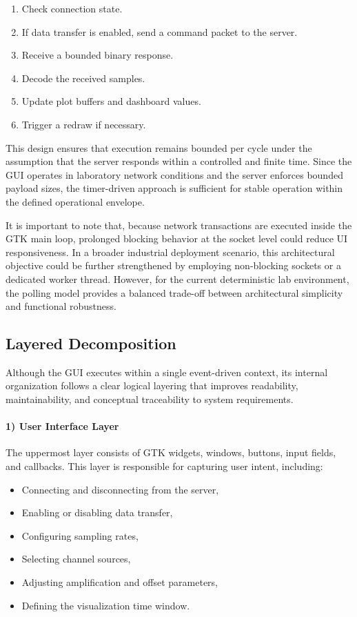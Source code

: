 \begin{enumerate}
	\item Check connection state.
	\item If data transfer is enabled, send a command packet to the server.
	\item Receive a bounded binary response.
	\item Decode the received samples.
	\item Update plot buffers and dashboard values.
	\item Trigger a redraw if necessary.
\end{enumerate}

This design ensures that execution remains bounded per cycle under the assumption that the server responds within a controlled and finite time. Since the GUI operates in laboratory network conditions and the server enforces bounded payload sizes, the timer-driven approach is sufficient for stable operation within the defined operational envelope.

It is important to note that, because network transactions are executed inside the GTK main loop, prolonged blocking behavior at the socket level could reduce UI responsiveness. In a broader industrial deployment scenario, this architectural objective could be further strengthened by employing non-blocking sockets or a dedicated worker thread. However, for the current deterministic lab environment, the polling model provides a balanced trade-off between architectural simplicity and functional robustness.

\subsection{Layered Decomposition}

Although the GUI executes within a single event-driven context, its internal organization follows a clear logical layering that improves readability, maintainability, and conceptual traceability to system requirements.

\paragraph{1) User Interface Layer}

The uppermost layer consists of GTK widgets, windows, buttons, input fields, and callbacks. This layer is responsible for capturing user intent, including:

\begin{itemize}
	\item Connecting and disconnecting from the server,
	\item Enabling or disabling data transfer,
	\item Configuring sampling rates,
	\item Selecting channel sources,
	\item Adjusting amplification and offset parameters,
	\item Defining the visualization time window.
\end{itemize}

